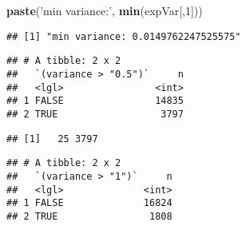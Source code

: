 \documentclass[]{article}
\newenvironment{Shaded}{\begin{snugshade}}{\end{snugshade}}
\newcommand{\KeywordTok}[1]{\textcolor[rgb]{0.13,0.29,0.53}{\textbf{#1}}}
\newcommand{\DecValTok}[1]{\textcolor[rgb]{0.00,0.00,0.81}{#1}}
\newcommand{\FloatTok}[1]{\textcolor[rgb]{0.00,0.00,0.81}{#1}}
\newcommand{\StringTok}[1]{\textcolor[rgb]{0.31,0.60,0.02}{#1}}
\newcommand{\CommentTok}[1]{\textcolor[rgb]{0.56,0.35,0.01}{\textit{#1}}}
\newcommand{\OperatorTok}[1]{\textcolor[rgb]{0.81,0.36,0.00}{\textbf{#1}}}
\newcommand{\NormalTok}[1]{#1}
\begin{document}
\begin{Shaded}
\begin{Highlighting}[]
\KeywordTok{paste}\NormalTok{(}\StringTok{'min variance:'}\NormalTok{, }\KeywordTok{min}\NormalTok{(expVar[,}\DecValTok{1}\NormalTok{]))}
\end{Highlighting}
\end{Shaded}

\begin{verbatim}
## [1] "min variance: 0.0149762247525575"
\end{verbatim}

\begin{Shaded}
\end{Shaded}

\begin{verbatim}
## # A tibble: 2 x 2
##   `(variance > "0.5")`     n
##   <lgl>                <int>
## 1 FALSE                14835
## 2 TRUE                  3797
\end{verbatim}

\begin{Shaded}
\end{Shaded}

\begin{verbatim}
## [1]   25 3797
\end{verbatim}

\begin{Shaded}
\end{Shaded}

\begin{verbatim}
## # A tibble: 2 x 2
##   `(variance > "1")`     n
##   <lgl>              <int>
## 1 FALSE              16824
## 2 TRUE                1808
\end{verbatim}
\end{document}
